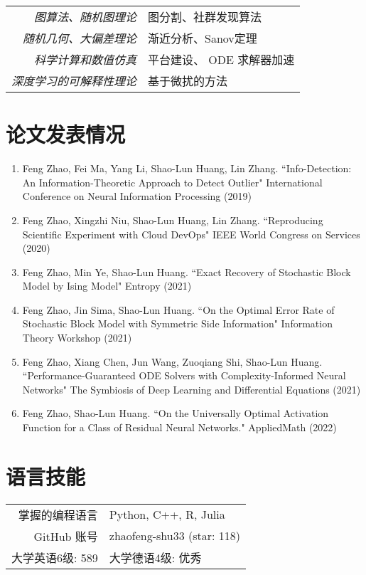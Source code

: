 \documentclass[12pt]{moderncv}
\begin{document}
\begin{tabular}{rl}
  \textit{图算法、随机图理论} & 图分割、社群发现算法\\
   \textit{随机几何、大偏差理论}& 渐近分析、Sanov定理\\
   \textit{科学计算和数值仿真} & 平台建设、 ODE 求解器加速\\ 
    \textit{深度学习的可解释性理论} & 基于微扰的方法\\
 \end{tabular}
 \section{论文发表情况}
 \begin{enumerate}
     \item Feng Zhao, Fei Ma, Yang Li, Shao-Lun Huang, Lin Zhang. ``Info-Detection: An Information-Theoretic Approach to Detect Outlier" International Conference on Neural Information Processing (2019)
     \item Feng Zhao, Xingzhi Niu, Shao-Lun Huang, Lin Zhang. ``Reproducing Scientific Experiment with Cloud DevOps" IEEE World Congress on Services (2020)
     \item Feng Zhao, Min Ye, Shao-Lun Huang. ``Exact Recovery of Stochastic Block Model by Ising Model" Entropy (2021)
     \item Feng Zhao, Jin Sima, Shao-Lun Huang. ``On the Optimal Error Rate of Stochastic Block Model with Symmetric Side Information" Information Theory Workshop (2021)
     \item Feng Zhao, Xiang Chen, Jun Wang, Zuoqiang Shi, Shao-Lun Huang. ``Performance-Guaranteed ODE Solvers with Complexity-Informed Neural Networks" The Symbiosis of Deep Learning and Differential Equations (2021)
     \item Feng Zhao, Shao-Lun Huang. ``On the Universally Optimal Activation Function for a Class of Residual Neural Networks." AppliedMath (2022)
 \end{enumerate}
 
\section{语言技能}
\begin{tabular}{rl}
    掌握的编程语言
    & Python, C++,
    R, Julia \\
    GitHub 账号 & zhaofeng-shu33 (star: 118) \\
    大学英语6级: 589 & 大学德语4级: 优秀\\
    \end{tabular}
\end{document}
